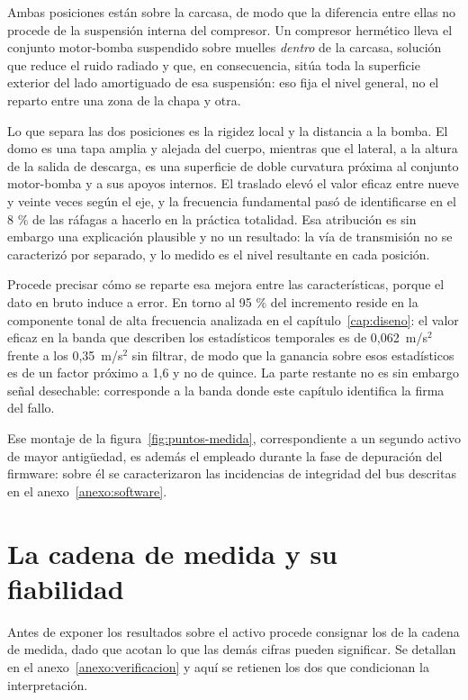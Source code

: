 Ambas posiciones están sobre la carcasa, de modo que la diferencia entre ellas no procede de
la suspensión interna del compresor. Un compresor hermético lleva el conjunto motor-bomba
suspendido sobre muelles \textit{dentro} de la carcasa, solución que reduce el ruido radiado
y que, en consecuencia, sitúa toda la superficie exterior del lado amortiguado de esa
suspensión: eso fija el nivel general, no el reparto entre una zona de la chapa y otra.

Lo que separa las dos posiciones es la rigidez local y la distancia a la bomba. El domo es
una tapa amplia y alejada del cuerpo, mientras que el lateral, a la altura de la salida de
descarga, es una superficie de doble curvatura próxima al conjunto motor-bomba y a sus
apoyos internos. El traslado elevó el valor eficaz entre nueve y veinte veces según el eje, y
la frecuencia fundamental pasó de identificarse en el 8 \% de las ráfagas a hacerlo en la
práctica totalidad. Esa atribución es sin embargo una explicación plausible y no un resultado:
la vía de transmisión no se caracterizó por separado, y lo medido es el nivel resultante en
cada posición.

Procede precisar cómo se reparte esa mejora entre las características, porque el dato en
bruto induce a error. En torno al 95 \% del incremento reside en la componente tonal de alta
frecuencia analizada en el capítulo~\ref{cap:diseno}: el valor eficaz en la banda que
describen los estadísticos temporales es de \mbox{0,062 m/s$^2$} frente a los
\mbox{0,35 m/s$^2$} sin filtrar, de modo que la ganancia sobre esos estadísticos es de un
factor próximo a 1,6 y no de quince. La parte restante no es sin embargo señal desechable:
corresponde a la banda donde este capítulo identifica la firma del fallo.

Ese montaje de la figura~\ref{fig:puntos-medida}, correspondiente a un segundo activo de
mayor antigüedad, es además el empleado durante la fase de depuración del firmware: sobre él
se caracterizaron las incidencias de integridad del bus descritas en el
anexo~\ref{anexo:software}.

\section{La cadena de medida y su fiabilidad}

Antes de exponer los resultados sobre el activo procede consignar los de la cadena de medida,
dado que acotan lo que las demás cifras pueden significar. Se detallan en el
anexo~\ref{anexo:verificacion} y aquí se retienen los dos que condicionan la interpretación.

